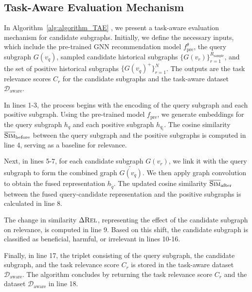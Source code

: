 \documentclass[letterpaper]{article} %
\begin{document}
\subsection{Task-Aware Evaluation Mechanism}

In Algorithm~\ref{alg:algorithm_TAE} , we present a task-aware evaluation mechanism for candidate subgraphs. Initially, we define the necessary inputs, which include the pre-trained GNN recommendation model $f^{\theta}_{\text{pre}}$, the query subgraph $G(v_q)$, sampled candidate historical subgraphs $\{G(v_r)\}_{r=1}^{R_\text{sample}}$, and the set of positive historical subgraphs $\{ G(v_q)^+ \}_{r=1}^{N}$. The outputs are the task relevance scores $C_r$ for the candidate subgraphs and the task-aware dataset $\mathcal{D}_{\text{aware}}$.

In lines 1-3, the process begins with the encoding of the query subgraph and each positive subgraph. Using the pre-trained model $f_{\text{pre}}$, we generate embeddings for the query subgraph $h_q$ and each positive subgraph $h_{q_i}$. The cosine similarity $\overline{\textsc{Sim}}_{\text{before}}$ between the query subgraph and the positive subgraphs is computed in line 4, serving as a baseline for relevance.

Next, in lines 5-7, for each candidate subgraph $G(v_r)$, we link it with the query subgraph to form the combined graph $\tilde{G(v_q)}$. We then apply graph convolution to obtain the fused representation $h_{\tilde{q}}$. The updated cosine similarity $\overline{\textsc{Sim}}_{\text{after}}$ between the fused query-candidate representation and the positive subgraphs is calculated in line 8.

The change in similarity $\Delta \textsc{Rel}$, representing the effect of the candidate subgraph on relevance, is computed in line 9. Based on this shift, the candidate subgraph is classified as beneficial, harmful, or irrelevant in lines 10-16.

Finally, in line 17, the triplet consisting of the query subgraph, the candidate subgraph, and the task relevance score $C_r$ is stored in the task-aware dataset $\mathcal{D}_{\text{aware}}$. The algorithm concludes by returning the task relevance score $C_r$ and the dataset $\mathcal{D}_{\text{aware}}$ in line 18.
\end{document}
